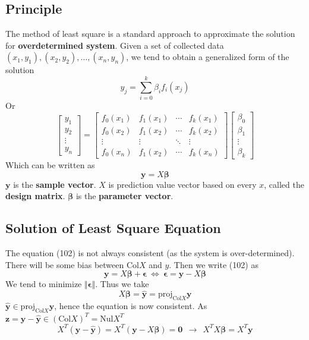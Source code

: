 \documentclass[11pt]{article}
\begin{document}
\subsection{Principle}
The method of least square is a standard approach to approximate the solution for \textbf{overdetermined system}. Given a set of collected data $(x_1,y_1),(x_2,y_2),\dots,(x_n,y_n)$, we tend to obtain a generalized form of the solution
\begin{equation}
    y_j = \sum_{i=0}^{k}\beta_if_i(x_j)
\end{equation}
Or
\begin{equation}
    \begin{bmatrix}
    y_1 \\ y_2 \\ \vdots \\ y_n
    \end{bmatrix} = 
    \begin{bmatrix}
    f_0(x_1) & f_1(x_1) & \cdots & f_k(x_1) \\
    f_0(x_2) & f_1(x_2) & \cdots & f_k(x_2) \\
    \vdots & \vdots & \ddots & \vdots \\
    f_0(x_n) & f_1(x_2) & \cdots & f_k(x_n) 
    \end{bmatrix} \begin{bmatrix}
    \beta_0 \\ \beta_1 \\ \vdots \\ \beta_k
    \end{bmatrix}
\end{equation}
Which can be written as
\begin{equation}
    \bm{y} = X\bm{\beta}
\end{equation}
$\bm{y}$ is the \textbf{sample vector}. $X$ is prediction value vector based on every $x$, called the \textbf{design matrix}. $\bm{\beta}$ is the \textbf{parameter vector}. 
\subsection{Solution of Least Square Equation}
The equation (102) is not always consistent (as the system is over-determined). There will be some bias between $\text{Col}X$ and $y$. Then we write (102) as
\begin{equation}
    \bm{y} = X\bm{\beta} + \bm{\epsilon}~\Leftrightarrow~\bm{\epsilon} = \bm{y} - X\bm{\beta}
\end{equation}
We tend to minimize $\Vert \bm{\epsilon} \Vert$. Thus we take 
\begin{equation}
    X\bm{\beta} = \hat{\bm{y}} = \text{proj}_{\text{Col}X} \bm{y}
\end{equation}
$\hat{\bm{y}} \in \text{proj}_{\text{Col}X} \bm{y}$, hence the equation is now consistent. As $\bm{z} = \bm{y} - \hat{\bm{y}} \in (\text{Col}X)^{T}= \text{Nul}X^{T}$
\begin{equation}
    X^{T}(\bm{y}-\hat{\bm{y}}) = X^{T} (\bm{y} - X\bm{\beta}) = \bm{0}~~\rightarrow~~\boxed{X^TX\bm{\beta} = X^T \bm{y}}
\end{equation}
\end{document}
